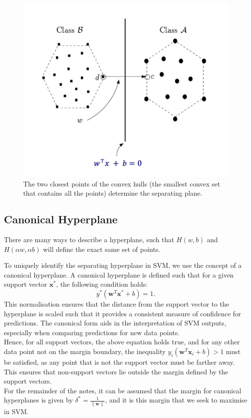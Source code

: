 \begin{figure}[H]
    \centering
    \includegraphics[width=0.5\linewidth]{img/convexhull.png}
    \caption{The two closest points of the convex hulls (the smallest convex set that contains all the points) determine the separating plane.}
    
\end{figure}
\subsection{Canonical Hyperplane}
There are many ways to describe a hyperplane, such that $H(w,b)$ and $H(\alpha w, \alpha b)$ will define the exact same set of points. 

To uniquely identify the separating hyperplane in SVM, we use the concept of a canonical hyperplane. A canonical hyperplane is defined such that for a given support vector \( \mathbf{x}^* \), the following condition holds:
\[
y^*(\mathbf{w}^T \mathbf{x}^* + b) = 1.
\]
This normalisation ensures that the distance from the support vector to the hyperplane is scaled such that it provides a consistent measure of confidence for predictions. The canonical form aids in the interpretation of SVM outputs, especially when comparing predictions for new data points.\\

Hence, for all support vectors, the above equation holds true, and for any other data point not on the margin boundary, the inequality \( y_i(\mathbf{w}^T \mathbf{x}_i + b) > 1 \) must be satisfied, as any point that is not the support vector must be farther away. This ensures that non-support vectors lie outside the margin defined by the support vectors. \\


For the remainder of the notes, it can be assumed that the margin for canonical hyperplanes is given by \( \delta^* = \frac{1}{\|\mathbf{w}\|} \), and it is this margin that we seek to maximise in SVM.\\

